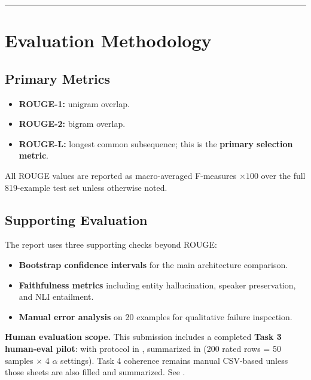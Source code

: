 \documentclass[11pt,a4paper]{article}
\newcommand{\sectionrule}{\vspace{6pt}\hrule\vspace{10pt}}
\newcommand{\tightitem}{\setlength\itemsep{2pt}\setlength\parskip{0pt}}
\begin{document}
\sectionrule

\section{Evaluation Methodology}

\subsection{Primary Metrics}

\begin{itemize}\tightitem
\item \textbf{ROUGE-1:} unigram overlap.
\item \textbf{ROUGE-2:} bigram overlap.
\item \textbf{ROUGE-L:} longest common subsequence; this is the \textbf{primary selection metric}.
\end{itemize}

All ROUGE values are reported as macro-averaged F-measures $\times 100$ over the full 819-example test set unless otherwise noted.

\subsection{Supporting Evaluation}

The report uses three supporting checks beyond ROUGE:

\begin{itemize}\tightitem
\item \textbf{Bootstrap confidence intervals} for the main architecture comparison.
\item \textbf{Faithfulness metrics} including entity hallucination, speaker preservation, and NLI entailment.
\item \textbf{Manual error analysis} on 20 examples for qualitative failure inspection.
\end{itemize}

\textbf{Human evaluation scope.} This submission includes a completed \textbf{Task 3 human-eval pilot}:  with protocol in , summarized in  (200 rated rows = 50 samples $\times$ 4 $\alpha$ settings). Task 4 coherence remains manual CSV-based unless those sheets are also filled and summarized. See .
\end{document}
